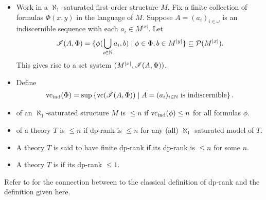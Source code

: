 \begin{Definition} \label{def_dp}
  \begin{itemize}
  \item
    Work in a $\aleph_1$-saturated first-order structure $M$.
    Fix a finite collection of formulas $\Phi(x, y)$ in the language of $M$.
    Suppose $A = (a_i)_{i \in \omega}$ is an indiscernible sequence with each $a_i \in M^{|x|}$.
    Let
    \begin{align*}
      \mathscr I(A, \Phi) = \{\phi(\bigcup_{i \in \mathbb{N}} a_i, b) \mid \phi \in \Phi, b \in M^{|y|}\} \subseteq \mathcal P(M^{|x|}).     
    \end{align*}
    This gives rise to a set system $(M^{|x|}, \mathscr I(A, \Phi))$.
  \item Define
    \begin{align*}
      \operatorname{vc}_{\operatorname{ind}}(\Phi) = \sup \left\{\operatorname{vc}(\mathscr I(A, \Phi)) \mid A = (a_i)_{i \in \mathbb{N}} \text{ is indiscernible}\right\}.
    \end{align*}
  \item {} of an $\aleph_1$-saturated structure $M$ is $\leq n$ if $\operatorname{vc}_{\operatorname{ind}}(\phi) \leq n$ for all formulas $\phi$.
  \item {} of a theory $T$ is $\leq n$ if dp-rank is $\leq n$ for any (all) $\aleph_1$-saturated model of $T$.
  \item A theory $T$ is said to have finite dp-rank if its dp-rank is $\leq n$ for some $n$.
  \item A theory $T$ is  if its dp-rank $\leq 1$.
  \end{itemize}
\end{Definition}

Refer to \cite{guingona} for the connection between to the classical definition of dp-rank and the definition given here.
